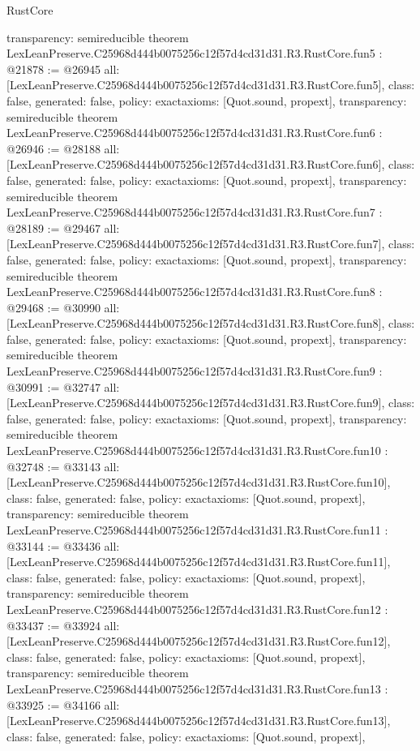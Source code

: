 \begin{lexlean}{RustCore}
\begin{coremodule}
{  transparency: semireducible
}
theorem LexLeanPreserve.C25968d444b0075256c12f57d4cd31d31.R3.RustCore.fun5 : @21878 := @26945 {
  all: [LexLeanPreserve.C25968d444b0075256c12f57d4cd31d31.R3.RustCore.fun5],
  class: false,
  generated: false,
  policy: exact{axioms: [Quot.sound, propext]},
  transparency: semireducible
}
theorem LexLeanPreserve.C25968d444b0075256c12f57d4cd31d31.R3.RustCore.fun6 : @26946 := @28188 {
  all: [LexLeanPreserve.C25968d444b0075256c12f57d4cd31d31.R3.RustCore.fun6],
  class: false,
  generated: false,
  policy: exact{axioms: [Quot.sound, propext]},
  transparency: semireducible
}
theorem LexLeanPreserve.C25968d444b0075256c12f57d4cd31d31.R3.RustCore.fun7 : @28189 := @29467 {
  all: [LexLeanPreserve.C25968d444b0075256c12f57d4cd31d31.R3.RustCore.fun7],
  class: false,
  generated: false,
  policy: exact{axioms: [Quot.sound, propext]},
  transparency: semireducible
}
theorem LexLeanPreserve.C25968d444b0075256c12f57d4cd31d31.R3.RustCore.fun8 : @29468 := @30990 {
  all: [LexLeanPreserve.C25968d444b0075256c12f57d4cd31d31.R3.RustCore.fun8],
  class: false,
  generated: false,
  policy: exact{axioms: [Quot.sound, propext]},
  transparency: semireducible
}
theorem LexLeanPreserve.C25968d444b0075256c12f57d4cd31d31.R3.RustCore.fun9 : @30991 := @32747 {
  all: [LexLeanPreserve.C25968d444b0075256c12f57d4cd31d31.R3.RustCore.fun9],
  class: false,
  generated: false,
  policy: exact{axioms: [Quot.sound, propext]},
  transparency: semireducible
}
theorem LexLeanPreserve.C25968d444b0075256c12f57d4cd31d31.R3.RustCore.fun10 : @32748 := @33143 {
  all: [LexLeanPreserve.C25968d444b0075256c12f57d4cd31d31.R3.RustCore.fun10],
  class: false,
  generated: false,
  policy: exact{axioms: [Quot.sound, propext]},
  transparency: semireducible
}
theorem LexLeanPreserve.C25968d444b0075256c12f57d4cd31d31.R3.RustCore.fun11 : @33144 := @33436 {
  all: [LexLeanPreserve.C25968d444b0075256c12f57d4cd31d31.R3.RustCore.fun11],
  class: false,
  generated: false,
  policy: exact{axioms: [Quot.sound, propext]},
  transparency: semireducible
}
theorem LexLeanPreserve.C25968d444b0075256c12f57d4cd31d31.R3.RustCore.fun12 : @33437 := @33924 {
  all: [LexLeanPreserve.C25968d444b0075256c12f57d4cd31d31.R3.RustCore.fun12],
  class: false,
  generated: false,
  policy: exact{axioms: [Quot.sound, propext]},
  transparency: semireducible
}
theorem LexLeanPreserve.C25968d444b0075256c12f57d4cd31d31.R3.RustCore.fun13 : @33925 := @34166 {
  all: [LexLeanPreserve.C25968d444b0075256c12f57d4cd31d31.R3.RustCore.fun13],
  class: false,
  generated: false,
  policy: exact{axioms: [Quot.sound, propext]},
}
\end{coremodule}
\end{lexlean}
